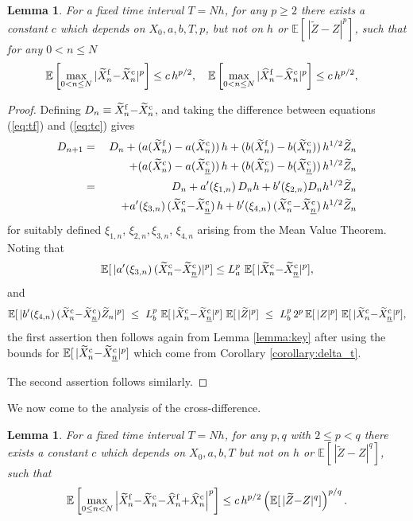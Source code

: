 \documentclass[11pt]{article}
\def \EE {{\mathbb{E}}}
\def \tZ {{\widetilde{Z}}}
\def \tXfn {{\widetilde{X}^{\rm f}_n}}
\def \tXcn {{\widetilde{X}^{\rm c}_n}}
\def \tXcl {{\widetilde{X}^{\rm c}_{\underline{n}}}}
\def \hXfn {{\widehat{X}^{\rm f}_n}}
\def \hXcn {{\widehat{X}^{\rm c}_n}}
\newtheorem{lemma}[theorem]{Lemma}
\begin{document}
\begin{lemma}
\label{lemma:delta_h}
For a fixed time interval $T\!=\!N h$, for any $p\!\geq\!2$ there exists a 
constant $c$ which depends on $X_0, a, b, T, p$, but not on $h$ or 
$\EE[\, |\tZ{-}Z|^p]$, such that for any $0\!<\!n\!\leq\!N$
\[
\EE\left[ \max_{0< n \leq N} |\tXfn{-}\tXcn|^p\right] \leq c\, h^{p/2}, ~~~ 
\EE\left[ \max_{0< n \leq N} |\hXfn{-}\hXcn|^p\right] \leq c\, h^{p/2}, ~~~ 
\]
\end{lemma}
\begin{proof}
Defining $D_n \equiv \tXfn {-} \tXcn$, and taking the difference between 
equations (\ref{eq:tf}) and (\ref{eq:tc}) gives
\begin{eqnarray*}
D_{n+1} &=& D_n + (a(\tXfn)-a(\tXcn))\, h + (b(\tXfn)-b(\tXcn)) \, h^{1/2} \tZ_n
\\     &&~~~~ + (a(\tXcn)-a(\tXcl)) \, h + (b(\tXcn)-b(\tXcl)) \, h^{1/2} \tZ_n
\\     &=& D_n + a'(\xi_{1,n})\, D_n h + b'(\xi_{2,n}) D_n h^{1/2} \tZ_n
\\     &&~~~~ + a'(\xi_{3,n})\, (\tXcn{-}\tXcl) \, h
          +  b'(\xi_{4,n})\, (\tXcn{-}\tXcl) \, h^{1/2} \tZ_n
\end{eqnarray*}
for suitably defined $\xi_{1,n}$, $\xi_{2,n}, \xi_{3,n}$, $\xi_{4,n}$ arising 
from the Mean Value Theorem.  
Noting that
\[
\EE[\,|a'(\xi_{3,n})\, (\tXcn{-}\tXcl) |^p] \leq
L_a^p \ \EE[\,|\tXcn{-}\tXcl|^p],
\]
and
\[
\EE[\,|b'(\xi_{4,n})\, (\tXcn{-}\tXcl)  \tZ_n|^p] 
\ \leq\ L_b^p \ \EE[\,|\tXcn{-}\tXcl|^p]\ \EE[\,|\tZ|^p]
\ \leq\ L_b^p\, 2^{p} \, \EE[\,|Z|^p]\ \EE[\,|\tXcn{-}\tXcl|^p],
\]
the first assertion then follows again from 
Lemma \ref{lemma:key} after using the bounds for $\EE[\,|\tXcn{-}\tXcl|^p]$ 
which come from Corollary \ref{corollary:delta_t}.

The second assertion follows similarly.
\end{proof}

We now come to the analysis of the cross-difference.

\begin{lemma}
\label{lemma:second_diff}
For a fixed time interval $T\!=\!N h$, for any $p, q$ with 
$2\!\leq\! p \!<\! q$ there exists a constant $c$ which depends on $
X_0, a, b, T$ but not on $h$ or $\EE[\, |\tZ{-}Z|^q]$, such that
\[
\EE\left[ \max_{0\leq n < N} \left|\tXfn{-}\tXcn {-} \hXfn{+}\hXcn\right|^p\right] 
\leq c\, h^{p/2} \left( \EE[\,|\tZ{-}Z|^q] \right)^{p/q}.
\]
\end{lemma}
\end{document}
